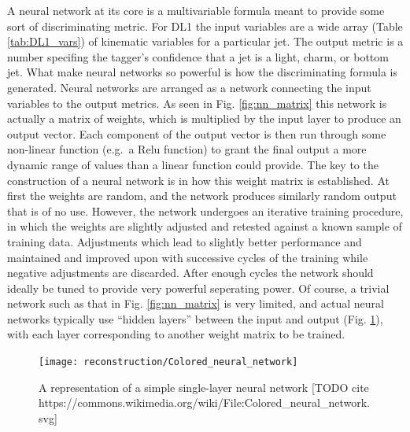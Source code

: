             A neural network at its core is a multivariable formula meant to provide some sort of discriminating metric\cite{MLatLHC}.
            For DL1 the input variables are a wide array (Table \ref{tab:DL1_vars})
                of kinematic variables for a particular jet.
            The output metric is a number specifing the tagger's confidence that a jet is
                a light, charm, or bottom jet.
            What make neural networks so powerful is how the discriminating formula is generated.
            Neural networks are arranged as a network connecting the input variables to the output metrics. 
            As seen in Fig. \ref{fig:nn_matrix} this network is actually a matrix of weights,
                which is multiplied by the input layer to produce an output vector.
            Each component of the output vector is then run through some non-linear function (e.g.\ a Relu function)
                to grant the final output a more dynamic range of values than a linear function could provide.
            The key to the construction of a neural network is in how this weight matrix is established.
            At first the weights are random, and the network produces similarly random output that is of no use.
            However, the network undergoes an iterative training procedure, in which the weights are slightly adjusted
                and retested against a known sample of training data.
            Adjustments which lead to slightly better performance and maintained and improved upon
                with successive cycles of the training while negative adjustments are discarded.
            After enough cycles the network should ideally be tuned to provide very powerful seperating power.
            Of course, a trivial network such as that in Fig. \ref{fig:nn_matrix} is very limited,
                and actual neural networks typically use ``hidden layers'' between the input and output (Fig. \ref{fig:colored_neural_network}),
                with each layer corresponding to another weight matrix to be trained.

            \begin{figure}[tbh] \center
                \texttt{[image: reconstruction/Colored\_neural\_network]}
                \caption{
                    A representation of a simple single-layer neural network
                    [TODO cite https://commons.wikimedia.org/wiki/File:Colored\_neural\_network.svg]
                }
                \label{fig:colored_neural_network}
            \end{figure}

